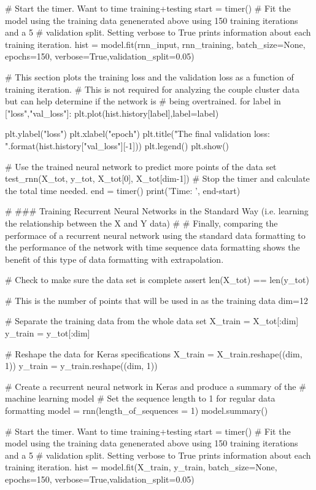 \documentclass[%
oneside,                 %
final,                   %
10pt]{article}
\begin{document}
# Start the timer.  Want to time training+testing
start = timer()
# Fit the model using the training data genenerated above using 150 training iterations and a 5%
# validation split.  Setting verbose to True prints information about each training iteration.
hist = model.fit(rnn_input, rnn_training, batch_size=None, epochs=150, 
                 verbose=True,validation_split=0.05)


# This section plots the training loss and the validation loss as a function of training iteration.
# This is not required for analyzing the couple cluster data but can help determine if the network is
# being overtrained.
for label in ["loss","val_loss"]:
    plt.plot(hist.history[label],label=label)

plt.ylabel("loss")
plt.xlabel("epoch")
plt.title("The final validation loss: {}".format(hist.history["val_loss"][-1]))
plt.legend()
plt.show()

# Use the trained neural network to predict more points of the data set
test_rnn(X_tot, y_tot, X_tot[0], X_tot[dim-1])
# Stop the timer and calculate the total time needed.
end = timer()
print('Time: ', end-start)


# ### Training Recurrent Neural Networks in the Standard Way (i.e. learning the relationship between the X and Y data)
# 
# Finally, comparing the performace of a recurrent neural network using the standard data formatting to the performance of the network with time sequence data formatting shows the benefit of this type of data formatting with extrapolation.

# Check to make sure the data set is complete
assert len(X_tot) == len(y_tot)

# This is the number of points that will be used in as the training data
dim=12

# Separate the training data from the whole data set
X_train = X_tot[:dim]
y_train = y_tot[:dim]

# Reshape the data for Keras specifications
X_train = X_train.reshape((dim, 1))
y_train = y_train.reshape((dim, 1))


# Create a recurrent neural network in Keras and produce a summary of the 
# machine learning model
# Set the sequence length to 1 for regular data formatting 
model = rnn(length_of_sequences = 1)
model.summary()

# Start the timer.  Want to time training+testing
start = timer()
# Fit the model using the training data genenerated above using 150 training iterations and a 5%
# validation split.  Setting verbose to True prints information about each training iteration.
hist = model.fit(X_train, y_train, batch_size=None, epochs=150, 
                 verbose=True,validation_split=0.05)
\end{document}
